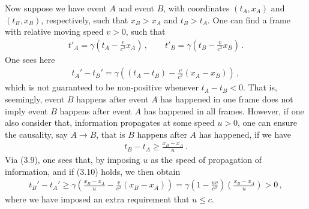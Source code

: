 \documentclass[11pt, onesided]{book}
\theoremstyle{break}
\theoremstyle{break}
\begin{document}
Now suppose we have event $A$ and event $B$, with coordinates $(t_A,x_A)$ and $(t_B, x_B)$, respectively, such that $x_B > x_A$ and $t_B > t_A$. One can find a frame with relative moving speed $v>0$, such that 
\begin{align*}
t'_A = \gamma\left(t_A - \frac{v}{c^2}x_A\right)\,,\qquad
t'_B = \gamma\left(t_B - \frac{v}{c^2}x_B\right)\,.
\end{align*}
One sees here
\begin{align}
t_A ' - t_B' = \gamma\left( (t_A - t_B) - \frac{v}{c^2}(x_A - x_B)\right) \,,
\end{align}
which is not guaranteed to be non-positive whenever $t_A - t_B <0$. That is, seemingly, event $B$ happens after event $A$ has happened in one frame does not imply event $B$ happens after event $A$ has happened in all frames. However, if one also consider that, information propagates at some speed $u>0$, one can ensure the causality, say $A\to B$, that is $B$ happens after $A$ has happened, if we have
\begin{align}
t_B - t_A \geq \frac{x_B - x_A}{u}\,.
\end{align}
Via (3.9), one sees that, by imposing $u$ as the speed of propagation of information, and if (3.10) holds, we then obtain
\begin{align*}
t_B ' - t_A' \geq \gamma\left( \frac{x_B - x_A}{u} - \frac{v}{c^2}(x_B - x_A) \right) = \gamma\left( 1- \frac{uv}{c^2}\right)\left( \frac{x_B - x_A}{u}\right) >0\,,
\end{align*}
where we have imposed an extra requirement that $u \leq c$. 
\end{document}
